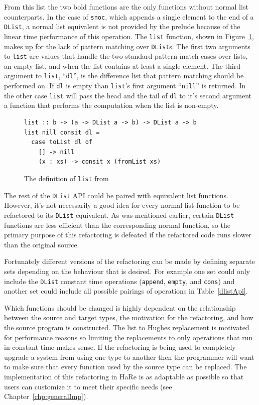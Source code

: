 From this list the two bold functions are the only functions without normal list counterparts. In the case of \texttt{snoc}, which appends a single element to the end of a \texttt{DList}, a normal list equivalent is not provided by the prelude because of the linear time performance of this operation. The \texttt{list} function, shown in Figure~\ref{dListList}, makes up for the lack of pattern matching over \texttt{DList}s. The first two arguments to \texttt{list} are values that handle the two standard pattern match cases over lists, an empty list, and when the list contains at least a single element. The third argument to \texttt{list}, ``\texttt{dl}'', is the difference list that pattern matching should be performed on. If \texttt{dl} is empty than \texttt{list}'s first argument ``\texttt{nill}'' is returned. In the other case \texttt{list} will pass the head and the tail of \texttt{dl} to it's second argument a function that performs the computation when the list is non-empty.

\begin{figure}[t]
\begin{lstlisting}
list :: b -> (a -> DList a -> b) -> DList a -> b
list nill consit dl =
  case toList dl of
    [] -> nill
    (x : xs) -> consit x (fromList xs)
\end{lstlisting}
\caption{The definition of \texttt{list} from~\citep{dlist}}
\label{dListList}
\end{figure}

The rest of the \texttt{DList} API could be paired with equivalent list functions. However, it's not necessarily a good idea for every normal list function to be refactored to its \texttt{DList} equivalent. As was mentioned earlier, certain \texttt{DList} functions are less efficient than the corresponding normal function, so the primary purpose of this refactoring is defeated if the refactored code runs slower than the original source.

Fortunately different versions of the refactoring can be made by defining separate sets depending on the behaviour that is desired. For example one set could only include the \texttt{DList} constant time operations (\texttt{append}, \texttt{empty}, and \texttt{cons}) and another set could include all possible pairings of operations in Table~\ref{dlistApi}.

Which functions should be changed is highly dependent on the relationship between the source and target types, the motivation for the refactoring, and how the source program is constructed. The list to Hughes replacement is motivated for performance reasons so limiting the replacements to only operations that run in constant time makes sense. If the refactoring is being used to completely upgrade a system from using one type to another then the programmer will want to make sure that every function used by the source type can be replaced. The implementation of this refactoring in HaRe is as adaptable as possible so that users can customize it to meet their specific needs (see Chapter~\ref{chp:generalImp}).


